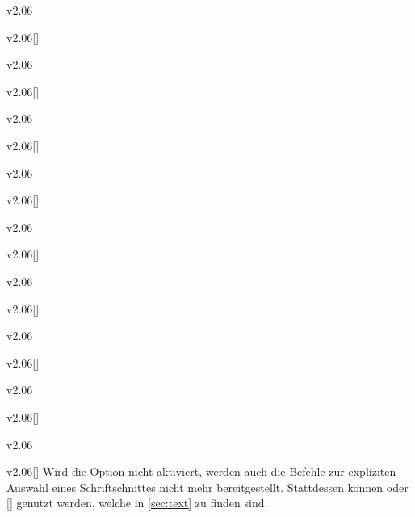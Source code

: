 \begin{Obsolete}{v2.06}{}
\begin{Obsolete}{v2.06}{[]}
\begin{Obsolete}{v2.06}{}
\begin{Obsolete}{v2.06}{[]}
\begin{Obsolete}{v2.06}{}
\begin{Obsolete}{v2.06}{[]}
\begin{Obsolete}{v2.06}{}
\begin{Obsolete}{v2.06}{[]}
\begin{Obsolete}{v2.06}{}
\begin{Obsolete}{v2.06}{[]}
\begin{Obsolete}{v2.06}{}
\begin{Obsolete}{v2.06}{[]}
\begin{Obsolete}{v2.06}{}
\begin{Obsolete}{v2.06}{[]}
\begin{Obsolete}{v2.06}{}
\begin{Obsolete}{v2.06}{[]}
\begin{Obsolete}{v2.06}{}
\begin{Obsolete}{v2.06}{[]}
\printobsoletelist%
%
Wird die Option  nicht aktiviert, werden auch die Befehle zur 
expliziten Auswahl eines Schriftschnittes nicht mehr bereitgestellt. 
Stattdessen können  oder [] 
genutzt werden, welche in \autoref{sec:text} zu finden sind.
\end{Obsolete}
\end{Obsolete}
\end{Obsolete}
\end{Obsolete}
\end{Obsolete}
\end{Obsolete}
\end{Obsolete}
\end{Obsolete}
\end{Obsolete}
\end{Obsolete}
\end{Obsolete}
\end{Obsolete}
\end{Obsolete}
\end{Obsolete}
\end{Obsolete}
\end{Obsolete}
\end{Obsolete}
\end{Obsolete}

